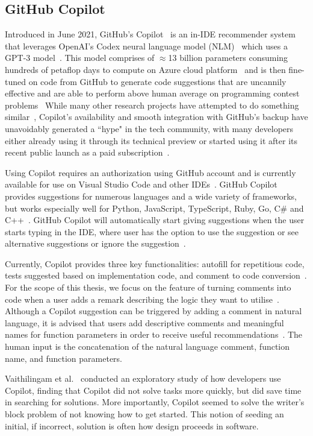 \subsection{GitHub Copilot}
Introduced in June 2021, GitHub's Copilot~\cite{Copilot-web} is an in-IDE recommender system that leverages OpenAI's Codex neural language model (NLM)~\cite{copilot} which uses a GPT-3 model~\cite{Gpt3}. This model comprises of $\approx$13 billion parameters consuming hundreds of petaflop days to compute on Azure cloud platform~\cite{copilot} and is then fine-tuned on code from GitHub to generate code suggestions that are uncannily effective and are able to perform above human average on programming contest problems~\cite{empirical_eval}
While many other research projects have attempted to do something similar~\cite{codesearch, natural, coacor}, Copilot's availability and smooth integration with GitHub's backup have unavoidably generated a ``hype" in the tech community, with many developers either already using it through its technical preview or started using it after its recent public launch as a paid subscription~\cite{Copilot-web}. 

Using Copilot requires an authorization using GitHub account and is currently available for use on Visual Studio Code and other IDEs~\cite{Copilot-web}. GitHub Copilot provides suggestions for numerous languages and a wide variety of frameworks, but works especially well for Python, JavaScript, TypeScript, Ruby, Go, C\# and C++~\cite{Copilot-web}. GitHub Copilot will automatically start giving suggestions when the user starts typing in the IDE, where user has the option to use the suggestion or see alternative suggestions or ignore the suggestion~\cite{Copilot-web}.

Currently, Copilot provides three key functionalities: autofill for repetitious code, tests suggested based on implementation code, and comment to code conversion~\cite{Copilot-web}. For the scope of this thesis, we focus on the feature of turning comments into code when a user adds a remark describing the logic they want to utilise~\cite{Copilot-web}. 
Although a Copilot suggestion can be triggered by adding a comment in natural language, it is advised that users add descriptive comments and meaningful names for function parameters in order to receive useful recommendations~\cite{Copilot-web}. The human input is the concatenation of the natural language comment, function name, and function parameters.

Vaithilingam et al.~\cite{Vaithilingam2022} conducted an exploratory study of how developers use Copilot, finding that Copilot did not solve tasks more quickly, but did save time in searching for solutions. 
More importantly, Copilot seemed to solve the writer's block problem of not knowing how to get started. This notion of seeding an initial, if incorrect, solution is often how design proceeds in software. 

